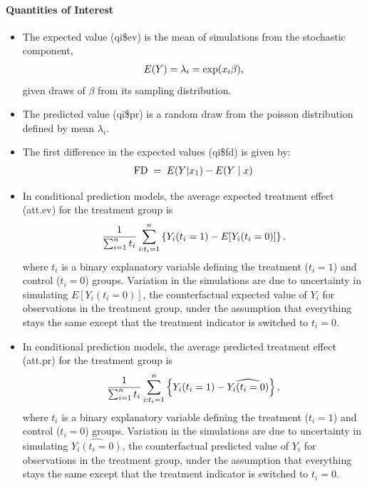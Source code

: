 \documentclass[letterpaper,10pt,english]{sphinxmanual}
\begin{document}
\paragraph{Quantities of Interest}
\label{zelig-poisson:quantities-of-interest}\begin{itemize}
\item {} 
The expected value (qi\$ev) is the mean of simulations from the
stochastic component,
\begin{gather}
\begin{split}E(Y) = \lambda_i =  \exp(x_i
  \beta),\end{split}\notag
\end{gather}
given draws of \(\beta\) from its sampling distribution.

\item {} 
The predicted value (qi\$pr) is a random draw from the poisson
distribution defined by mean \(\lambda_i\).

\item {} 
The first difference in the expected values (qi\$fd) is given by:
\begin{gather}
\begin{split}\textrm{FD} \; = \; E(Y | x_1) - E(Y \mid x)\end{split}\notag
\end{gather}
\item {} 
In conditional prediction models, the average expected treatment
effect (att.ev) for the treatment group is
\begin{gather}
\begin{split}\frac{1}{\sum_{i=1}^n t_i}\sum_{i:t_i=1}^n \left\{ Y_i(t_i=1) -
      E[Y_i(t_i=0)] \right\},\end{split}\notag
\end{gather}
where \(t_i\) is a binary explanatory variable defining the
treatment (\(t_i=1\)) and control (\(t_i=0\)) groups.
Variation in the simulations are due to uncertainty in simulating
\(E[Y_i(t_i=0)]\), the counterfactual expected value of
\(Y_i\) for observations in the treatment group, under the
assumption that everything stays the same except that the treatment
indicator is switched to \(t_i=0\).

\item {} 
In conditional prediction models, the average predicted treatment
effect (att.pr) for the treatment group is
\begin{gather}
\begin{split}\frac{1}{\sum_{i=1}^n t_i}\sum_{i:t_i=1}^n \left\{ Y_i(t_i=1) -
      \widehat{Y_i(t_i=0)} \right\},\end{split}\notag
\end{gather}
where \(t_i\) is a binary explanatory variable defining the
treatment (\(t_i=1\)) and control (\(t_i=0\)) groups.
Variation in the simulations are due to uncertainty in simulating
\(\widehat{Y_i(t_i=0)}\), the counterfactual predicted value of
\(Y_i\) for observations in the treatment group, under the
assumption that everything stays the same except that the treatment
indicator is switched to \(t_i=0\).

\end{itemize}
\end{document}

